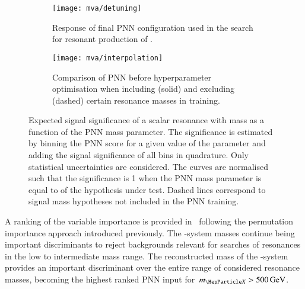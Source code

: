 \begin{figure}[htbp]
  \centering

  \begin{subfigure}[t]{.49\textwidth}
    \texttt{[image: mva/detuning]}
    \caption{Response of final PNN configuration used in the search
      for resonant production of \HH.}
    \label{fig:pnn_detuning}
  \end{subfigure}\hfill%
  \begin{subfigure}[t]{.49\textwidth}
    \centering
    \texttt{[image: mva/interpolation]}
    \caption{Comparison of PNN before hyperparameter optimisation when
      including (solid) and excluding (dashed) certain resonance
      masses in training.}
    \label{fig:pnn_interpolation}
  \end{subfigure}

  \caption[Expected signal significance as a function of the PNN mass
  parameter.]{Expected signal significance of a scalar resonance with mass \mX
    as a function of the PNN mass parameter. The significance is estimated by
    binning the PNN score for a given value of the parameter and adding the
    signal significance of all bins in quadrature. Only statistical
    uncertainties are considered. The curves are normalised such that the
    significance is 1 when the PNN mass parameter is equal to \mX of the
    hypothesis under test. Dashed lines correspond to signal mass hypotheses not
    included in the PNN training.}
  \label{fig:pnn_properties}
\end{figure}

A ranking of the variable importance is provided
in~ following the permutation importance
approach introduced previously. The \PHiggs-system masses continue
being important discriminants to reject backgrounds relevant for
searches of resonances in the low to intermediate mass range. The
reconstructed mass of the \HH-system provides an important
discriminant over the entire range of considered resonance masses,
becoming the highest ranked PNN input for~$\mX > \SI{500}{\GeV}$.


